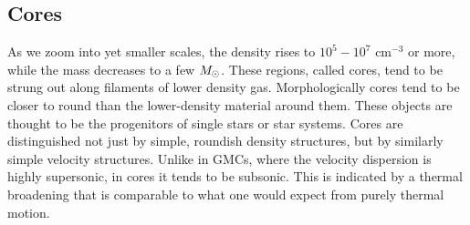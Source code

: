 \subsection{Cores}

As we zoom into yet smaller scales, the density rises to $10^5 - 10^7$ cm$^{-3}$ or more, while the mass decreases to a few $M_{\odot}$. These regions, called cores, tend to be strung out along filaments of lower density gas. Morphologically cores tend to be closer to round than the lower-density material around them. These objects are thought to be the progenitors of single stars or star systems. Cores are distinguished not just by simple, roundish density structures, but by similarly simple velocity structures. Unlike in GMCs, where the velocity dispersion is highly supersonic, in cores it tends to be subsonic. This is indicated by a thermal broadening that is comparable to what one would expect from purely thermal motion.


